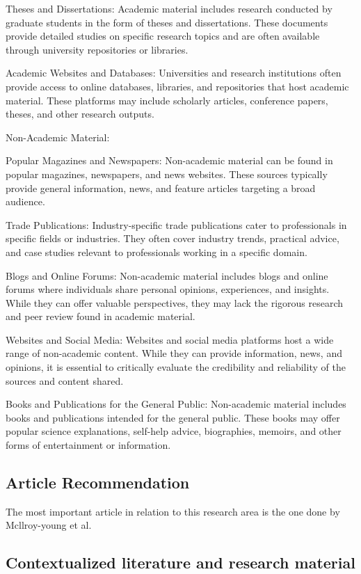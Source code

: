 \begin{spacing}{2.0}
Theses and Dissertations: Academic material includes research conducted by graduate students in the form of theses and dissertations. These documents provide detailed studies on specific research topics and are often available through university repositories or libraries.

Academic Websites and Databases: Universities and research institutions often provide access to online databases, libraries, and repositories that host academic material. These platforms may include scholarly articles, conference papers, theses, and other research outputs.

Non-Academic Material:

Popular Magazines and Newspapers: Non-academic material can be found in popular magazines, newspapers, and news websites. These sources typically provide general information, news, and feature articles targeting a broad audience.

Trade Publications: Industry-specific trade publications cater to professionals in specific fields or industries. They often cover industry trends, practical advice, and case studies relevant to professionals working in a specific domain.

Blogs and Online Forums: Non-academic material includes blogs and online forums where individuals share personal opinions, experiences, and insights. While they can offer valuable perspectives, they may lack the rigorous research and peer review found in academic material.

Websites and Social Media: Websites and social media platforms host a wide range of non-academic content. While they can provide information, news, and opinions, it is essential to critically evaluate the credibility and reliability of the sources and content shared.

Books and Publications for the General Public: Non-academic material includes books and publications intended for the general public. These books may offer popular science explanations, self-help advice, biographies, memoirs, and other forms of entertainment or information.

\subsection{Article Recommendation}

The most important article in relation to this research area is the one done by Mcllroy-young et al\cite{stylometryChess}. 

\subsection{Contextualized literature and research material}


\end{spacing}
